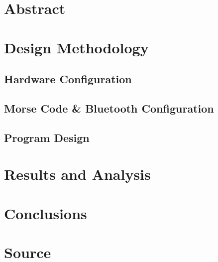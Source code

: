 \documentclass[11pt]{article}
\begin{document}


\section{Abstract}
\label{sec:abstract}





\section{Design Methodology}
\label{sec:design_methodology}




\subsection{Hardware Configuration}
\label{sub:hardware_configuration}




\subsection{Morse Code \& Bluetooth Configuration}
\label{sub:morse_code_&_bluetooth_configuration}




\subsection{Program Design}
\label{sub:program_design}




\section{Results and Analysis}
\label{sec:results_and_analysis}




\section{Conclusions}
\label{sec:conclusions}




\section{Source}
\label{sec:source}



\end{document}
